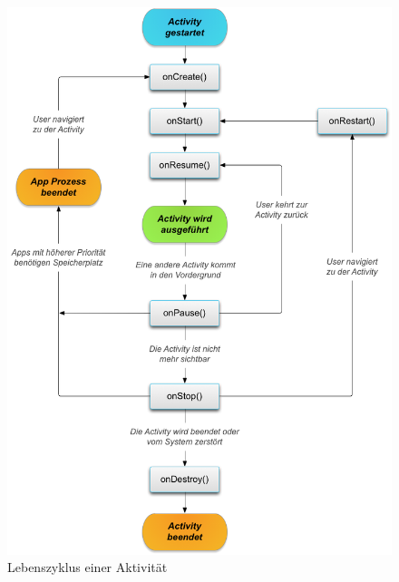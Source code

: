\begin{figure}[htb]
    \centering
    \includegraphics[width=1\textwidth]{bilder/android_activity_lifecycle.png}
    \caption{Lebenszyklus einer Aktivität \cite{programmieren_lernen_programmier_2018}}
    \label{fig:android-lebenszyklus-acitvity}
\end{figure}

